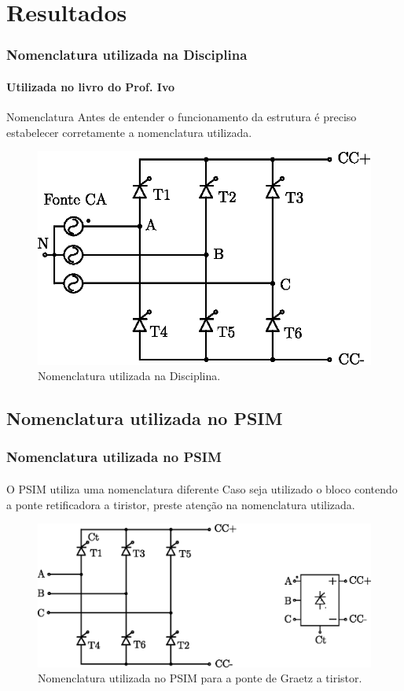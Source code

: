 \documentclass[aspectratio=43]{beamer}
\begin{document}

\section{Resultados}

\begin{frame}
	\frametitle{Nomenclatura utilizada na Disciplina }
	\framesubtitle{Utilizada no livro do Prof. Ivo}
	\begin{block}{Nomenclatura}
		Antes de entender o funcionamento da estrutura é preciso estabelecer corretamente a nomenclatura utilizada.
	\end{block}	
	\begin{figure}[!h]
		\centering
		\includegraphics[width=0.5\linewidth]{figuras/NomenclaturaUtilizadaNaDisciplina}
		\caption{Nomenclatura utilizada na Disciplina.}
		\label{fig:NomenclaturaUtilizadaNaDisciplina}
	\end{figure}	
	
\end{frame}


\subsection{Nomenclatura utilizada no PSIM}
\begin{frame}
	\frametitle{Nomenclatura utilizada no PSIM}
	\framesubtitle{}
	\begin{block}{O PSIM utiliza uma nomenclatura diferente}
		Caso seja utilizado o bloco contendo a ponte retificadora a tiristor, preste atenção na nomenclatura utilizada.
	\end{block}
\begin{figure}[!h]
	\centering
	\includegraphics[width=0.7\linewidth]{figuras/PonteTiristorPSIM}
	\caption{Nomenclatura utilizada no PSIM para a ponte de Graetz a tiristor.}
	\label{fig:PonteTiristorPSIM}
\end{figure}
	
\end{frame}
\end{document}
